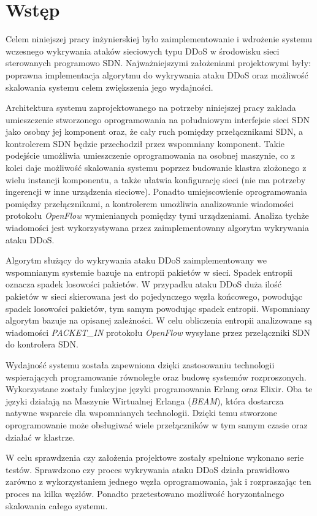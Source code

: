 \chapter{Wstęp}

Celem niniejszej pracy inżynierskiej było zaimplementowanie i wdrożenie systemu
wczesnego wykrywania ataków sieciowych typu DDoS w środowisku sieci sterowanych
programowo SDN. Najważniejszymi założeniami projektowymi były: poprawna
implementacja algorytmu do wykrywania ataku DDoS oraz możliwość skalowania
systemu celem zwiększenia jego wydajności.

Architektura systemu zaprojektowanego na potrzeby niniejszej pracy zakłada
umieszczenie stworzonego oprogramowania na południowym interfejsie sieci SDN
jako osobny jej komponent oraz, że cały ruch pomiędzy przełącznikami SDN, a
kontrolerem SDN będzie przechodził przez wspomniany komponent. Takie podejście
umożliwia umieszczenie oprogramowania na osobnej maszynie, co z kolei daje
możliwość skalowania systemu poprzez budowanie klastra złożonego z wielu
instancji komponentu, a także ułatwia konfigurację sieci (nie ma potrzeby
ingerencji w inne urządzenia sieciowe). Ponadto umiejscowienie oprogramowania
pomiędzy przełącznikami, a kontrolerem umożliwia analizowanie wiadomości
protokołu \textit{OpenFlow} wymienianych pomiędzy tymi urządzeniami. Analiza
tychże wiadomości jest wykorzystywana przez zaimplementowany algorytm wykrywania
ataku DDoS.

Algorytm służący do wykrywania ataku DDoS zaimplementowany we wspomnianym
systemie bazuje na entropii pakietów w sieci. Spadek entropii oznacza spadek
losowości pakietów. W przypadku ataku DDoS duża ilość pakietów w sieci
skierowana jest do pojedynczego węzła końcowego, powodując spadek losowości
pakietów, tym samym powodując spadek entropii. Wspomniany algorytm bazuje na
opisanej zależności. W celu obliczenia entropii analizowane są wiadomości
\textit{PACKET\_IN} protokołu \textit{OpenFlow} wysyłane przez przełączniki SDN
do kontrolera SDN.

Wydajność systemu została zapewniona dzięki zastosowaniu technologii
wspierających programowanie równoległe oraz budowę systemów rozproszonych.
Wykorzystane zostały funkcyjne języki programowania Erlang oraz Elixir. Oba te
języki działają na Maszynie Wirtualnej Erlanga (\textit{BEAM}), która dostarcza
natywne wsparcie dla wspomnianych technologii. Dzięki temu stworzone
oprogramowanie może obsługiwać wiele przełączników w tym samym czasie oraz
działać w klastrze.

W celu sprawdzenia czy założenia projektowe zostały spełnione wykonano serie
testów. Sprawdzono czy proces wykrywania ataku DDoS działa prawidłowo zarówno z
wykorzystaniem jednego węzła oprogramowania, jak i rozpraszając ten proces na
kilka węzłów. Ponadto przetestowano możliwość horyzontalnego skalowania całego
systemu.
